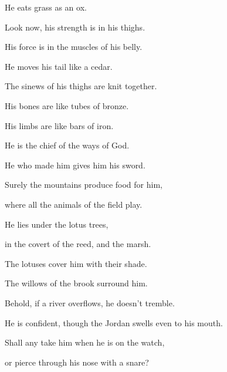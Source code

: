 {\par }{\QB He eats grass as an ox.
\par }{\Q {}Look now, his strength is in his thighs.
\par }{\QB His force is in the muscles of his belly.
\par }{\Q {}He moves his tail like a cedar.
\par }{\QB The sinews of his thighs are knit together.
\par }{\Q {}His bones are like tubes of bronze.
\par }{\QB His limbs are like bars of iron.
\par }{\BB \par }{\Q {}He is the chief of the ways of God.
\par }{\QB He who made him gives him his sword.
\par }{\Q {}Surely the mountains produce food for him,
\par }{\QB where all the animals of the field play.
\par }{\Q {}He lies under the lotus trees,
\par }{\QB in the covert of the reed, and the marsh.
\par }{\Q {}The lotuses cover him with their shade.
\par }{\QB The willows of the brook surround him.
\par }{\Q {}Behold, if a river overflows, he doesn’t tremble.
\par }{\QB He is confident, though the Jordan swells even to his mouth.
\par }{\Q {}Shall any take him when he is on the watch,
\par }{\QB or pierce through his nose with a snare?
\par }{\BB \par }
